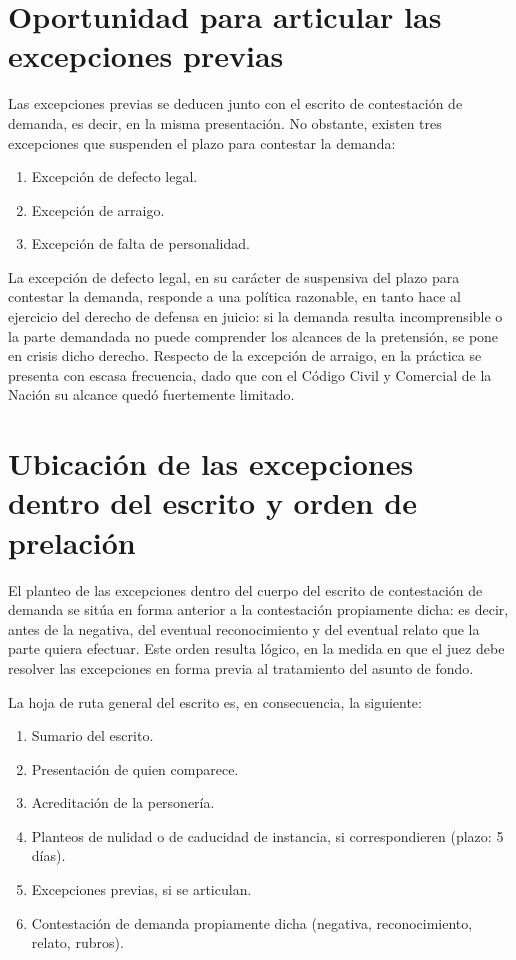 \documentclass[12pt,oneside]{book}
\begin{document}
\section{Oportunidad para articular las excepciones previas}

Las excepciones previas se deducen junto con el escrito de contestación de demanda, es decir, en la misma presentación. No obstante, existen tres excepciones que suspenden el plazo para contestar la demanda:

\begin{enumerate}
    \item Excepción de defecto legal.
    \item Excepción de arraigo.
    \item Excepción de falta de personalidad.
\end{enumerate}

La excepción de defecto legal, en su carácter de suspensiva del plazo para contestar la demanda, responde a una política razonable, en tanto hace al ejercicio del derecho de defensa en juicio: si la demanda resulta incomprensible o la parte demandada no puede comprender los alcances de la pretensión, se pone en crisis dicho derecho. Respecto de la excepción de arraigo, en la práctica se presenta con escasa frecuencia, dado que con el Código Civil y Comercial de la Nación su alcance quedó fuertemente limitado.

\section{Ubicación de las excepciones dentro del escrito y orden de prelación}

El planteo de las excepciones dentro del cuerpo del escrito de contestación de demanda se sitúa en forma anterior a la contestación propiamente dicha: es decir, antes de la negativa, del eventual reconocimiento y del eventual relato que la parte quiera efectuar. Este orden resulta lógico, en la medida en que el juez debe resolver las excepciones en forma previa al tratamiento del asunto de fondo.

La hoja de ruta general del escrito es, en consecuencia, la siguiente:

\begin{enumerate}
    \item Sumario del escrito.
    \item Presentación de quien comparece.
    \item Acreditación de la personería.
    \item Planteos de nulidad o de caducidad de instancia, si correspondieren (plazo: 5 días).
    \item Excepciones previas, si se articulan.
    \item Contestación de demanda propiamente dicha (negativa, reconocimiento, relato, rubros).
\end{enumerate}
\end{document}

